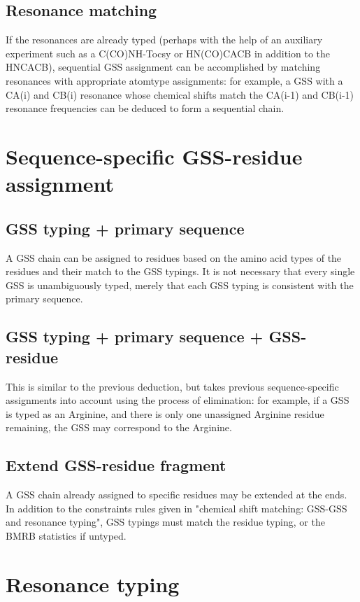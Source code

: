 \subsection*{Resonance matching}
If the resonances are already typed (perhaps with the help of an auxiliary
experiment such as a C(CO)NH-Tocsy or HN(CO)CACB in addition to the HNCACB), 
sequential GSS assignment can be accomplished by matching resonances with
appropriate atomtype assignments: for example, a GSS with a CA(i) and CB(i)
resonance whose chemical shifts match the CA(i-1) and CB(i-1) resonance
frequencies can be deduced to form a sequential chain.



\section*{Sequence-specific GSS-residue assignment}

\subsection*{GSS typing + primary sequence}
A GSS chain can be assigned to residues based on the amino acid types of the 
residues and their match to the GSS typings.  It is not necessary that every
single GSS is unambiguously typed, merely that each GSS typing is consistent
with the primary sequence.

\subsection*{GSS typing + primary sequence + GSS-residue}
This is similar to the previous deduction, but takes previous sequence-specific
assignments into account using the process of elimination: for example, if a
GSS is typed as an Arginine, and there is only one unassigned Arginine residue 
remaining, the GSS may correspond to the Arginine.

\subsection*{Extend GSS-residue fragment}
A GSS chain already assigned to specific residues may be extended at the ends.
In addition to the constraints rules given in 
"chemical shift matching: GSS-GSS and resonance typing",
GSS typings must match the residue typing, or the BMRB statistics if untyped.



\section*{Resonance typing}


